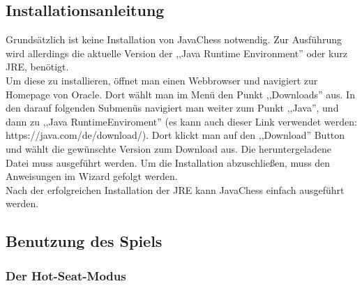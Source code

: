 \documentclass[12pt,a4paper]{article}
\begin{document}
 \subsection{Installationsanleitung}
	Grundsätzlich ist keine Installation von JavaChess notwendig. Zur Ausführung wird allerdings die aktuelle Version der ,,Java Runtime Environment'' oder kurz JRE, benötigt.\\
Um diese zu installieren, öffnet man einen Webbrowser und navigiert zur Homepage von Oracle. Dort wählt man im Menü den Punkt ,,Downloads'' aus. In den darauf folgenden Submenüs navigiert man weiter zum Punkt ,,Java'', und dann zu ,,Java RuntimeEnviroment'' (es kann auch dieser Link verwendet werden: https://java.com/de/download/).  Dort klickt man auf den ,,Download'' Button und wählt die gewünschte Version zum Download aus. 
Die heruntergeladene Datei muss ausgeführt werden. Um die Installation abzuschließen, muss den Anweisungen im Wizard gefolgt werden. \\
Nach der erfolgreichen Installation der JRE kann JavaChess einfach ausgeführt werden.

 \subsection{Benutzung des Spiels}
	
	\subsubsection{Der Hot-Seat-Modus}
	\label{SUBSUBSEC:USERDOCHOTSEAT}
	
\end{document}
